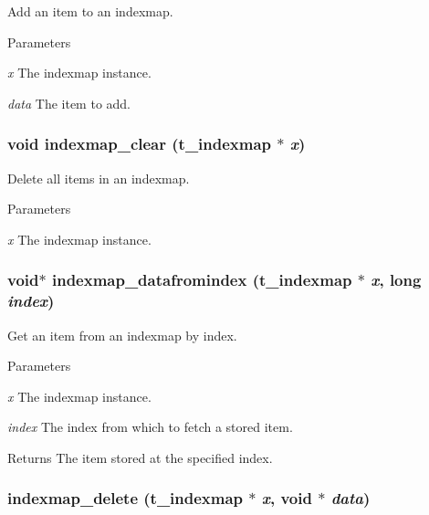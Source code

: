 Add an item to an indexmap. 
\begin{DoxyParams}{Parameters}
\item[{\em x}]The indexmap instance. \item[{\em data}]The item to add. \end{DoxyParams}
\hypertarget{group__indexmap_gab6213ed82d2f91a7d48581efee62bae4}{
\subsubsection[{indexmap\_\-clear}]{\setlength{\rightskip}{0pt plus 5cm}void indexmap\_\-clear ({\bf t\_\-indexmap} $\ast$ {\em x})}}
\label{group__indexmap_gab6213ed82d2f91a7d48581efee62bae4}


Delete all items in an indexmap. 
\begin{DoxyParams}{Parameters}
\item[{\em x}]The indexmap instance. \end{DoxyParams}
\hypertarget{group__indexmap_gafca8c58c30ecb6e128209e8df80a51c0}{
\subsubsection[{indexmap\_\-datafromindex}]{\setlength{\rightskip}{0pt plus 5cm}void$\ast$ indexmap\_\-datafromindex ({\bf t\_\-indexmap} $\ast$ {\em x}, \/  long {\em index})}}
\label{group__indexmap_gafca8c58c30ecb6e128209e8df80a51c0}


Get an item from an indexmap by index. 
\begin{DoxyParams}{Parameters}
\item[{\em x}]The indexmap instance. \item[{\em index}]The index from which to fetch a stored item. \end{DoxyParams}
\begin{DoxyReturn}{Returns}
The item stored at the specified index. 
\end{DoxyReturn}
\hypertarget{group__indexmap_ga6443c8bb19d6064f9aedacc170119215}{
\subsubsection[{indexmap\_\-delete}]{ indexmap\_\-delete ({\bf t\_\-indexmap} $\ast$ {\em x}, \/  void $\ast$ {\em data})}}
\label{group__indexmap_ga6443c8bb19d6064f9aedacc170119215}


